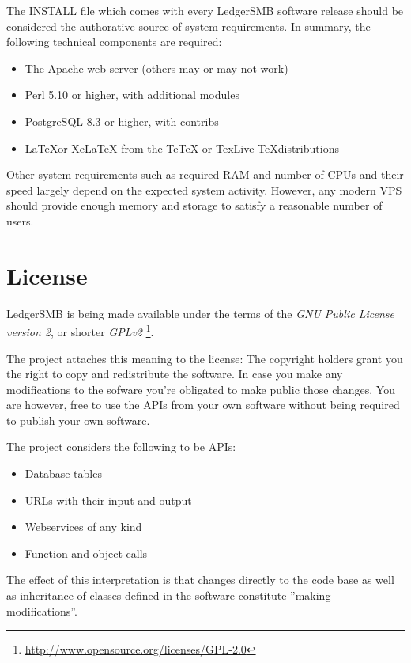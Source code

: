 The INSTALL file which comes with every LedgerSMB software release should be
considered the authorative source of system requirements. In summary, the
following technical components are required:

\begin{itemize}
\item The Apache web server (others may or may not work)
\item Perl 5.10 or higher, with additional modules
\item PostgreSQL 8.3 or higher, with contribs
\item \LaTeX or XeLaTeX from the TeTeX or TexLive \TeX distributions
\end{itemize}

Other system requirements such as required RAM and number of CPUs and their speed
largely depend on the expected system activity. However, any modern VPS should
provide enough memory and storage to satisfy a reasonable number of users.

\section{License}
\label{sec-ledgersmb-license}

LedgerSMB is being made available under the terms of the
\textit{GNU Public License version 2}, or shorter \textit{GPLv2}
\footnote{\url{http://www.opensource.org/licenses/GPL-2.0}}.

The project attaches this meaning to the license:
The copyright holders grant you the right to copy and
redistribute the software.  In case you make any modifications to the sofware
you're obligated to make public those changes.  You are however, free to use
the APIs from your own software without being required to publish your own software.

The project considers the following to be APIs:
\begin{itemize}
\item Database tables
\item URLs with their input and output
\item Webservices of any kind
\item Function and object calls
\end{itemize}

The effect of this interpretation is that changes directly to the code base as
well as inheritance of classes defined in the software constitute ''making modifications''.

